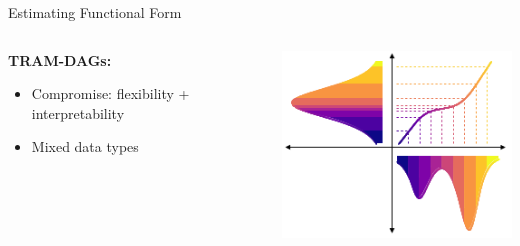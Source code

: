 \documentclass[onlytextwidth,english]{beamer}\usepackage[]{graphicx}\usepackage[]{xcolor}
\begin{document}
\begin{frame}{Estimating Functional Form}
\begin{columns}
\begin{column}{0.75\textwidth}
\textbf{TRAM-DAGs:}
\begin{itemize}
    \item Compromise: flexibility + interpretability
    \item Mixed data types
\end{itemize}
\end{column}
\begin{column}{0.23\textwidth}
\includegraphics[width=\textwidth]{img/TRAM_Raw.png}
\end{column}
\end{columns}

\end{frame}
\end{document}
